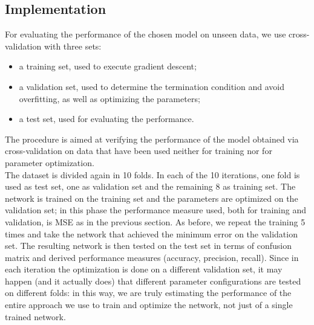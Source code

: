 \documentclass{article}
\begin{document}
\subsection{Implementation}
For evaluating the performance of the chosen model on unseen data, we use cross-validation with three sets:
\begin{itemize}
	\item a training set, used to execute gradient descent;
	\item a validation set, used to determine the termination condition and avoid overfitting, as well as optimizing the parameters;
	\item a test set, used for evaluating the performance.
\end{itemize}
The procedure is aimed at verifying the performance of the model obtained via cross-validation on data that have been used neither for training nor for parameter optimization.\\
The dataset is divided again in 10 folds. In each of the 10 iterations, one fold is used as test set, one as validation set and the remaining 8 as training set. The network is trained on the training set and the parameters are optimized on the validation set; in this phase the performance measure used, both for training and validation, is MSE as in the previous section. As before, we repeat the training 5 times and take the network that achieved the minimum error on the validation set. The resulting network is then tested on the test set in terms of confusion matrix and derived performance measures (accuracy, precision, recall). Since in each iteration the optimization is done on a different validation set, it may happen (and it actually does) that different parameter configurations are tested on different folds: in this way, we are truly estimating the performance of the entire approach we use to train and optimize the network, not just of a single trained network.\\
\end{document}
